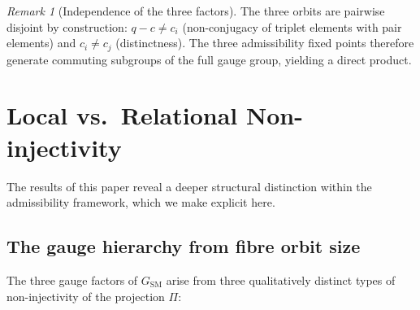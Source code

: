 \documentclass[11pt,a4paper]{article}
\theoremstyle{definition}
\theoremstyle{remark}
\newtheorem{remark}[theorem]{Remark}
\begin{document}
      \begin{remark}[Independence of the three factors]
The three orbits are pairwise disjoint by construction: $q - c \neq c_i$ (non-conjugacy of
triplet elements with pair elements) and $c_i \neq c_j$ (distinctness).
The three admissibility fixed points therefore generate commuting subgroups of the full
gauge group, yielding a direct product.
      \end{remark}

  \section{Local vs.\ Relational Non-injectivity}
    \label{sec:local-relational}

    The results of this paper reveal a deeper structural distinction within the admissibility
    framework, which we make explicit here.

    \subsection{The gauge hierarchy from fibre orbit size}
      \label{ssec:orbit-size-hierarchy}

      The three gauge factors of $G_{\mathrm{SM}}$ arise from three qualitatively distinct types of
      non-injectivity of the projection $\Pi$:
\end{document}
